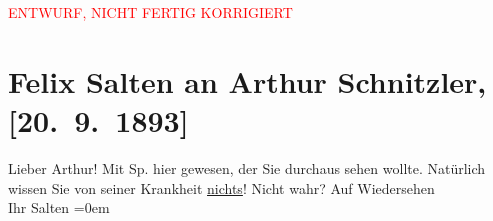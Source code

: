 
\begin{center}
            \textcolor{red}{ENTWURF, NICHT FERTIG KORRIGIERT}
                      \end{center}
            
         
         \renewcommand{\erwaehntePersonen}{Personen: Richard Specht}
         \renewcommand{\erwaehnteOrte}{Orte: Wien}
         \renewcommand{\erwaehnteWerke}{}
               \section[Felix Salten an Arthur Schnitzler, {[}20. 9. 1893{]}]{ Felix Salten an Arthur Schnitzler, {[}20. 9. 1893{]}}\nopagebreak{}\rehead{ }\begin{ledgroupsized}[t]{13cm}\normalsize\beginnumbering \toendnotes[C]{\smallbreak\pagebreak[2]} 
\pstart
           \noindent{}{\pb}Lieber Arthur! Mit Sp. hier gewesen, der Sie durchaus sehen wollte. Natürlich wissen Sie von
               seiner Krankheit \uline{nichts}! Nicht wahr? \pend
           \pstart
           Auf Wiedersehen {\\[\baselineskip]}Ihr \spacefill\mbox{Salten}\pend
           \leftskip=0em{}
         
         \endnumbering{}\end{ledgroupsized}\begin{anhang}\end{anhang}\newcommand{\dateiname}{L03129}\newcommand{\titel}{Felix Salten an Arthur Schnitzler, [20. 9. 1893]}\newcommand{\editorInnen}{Martin Anton Müller und Laura Untner}
      